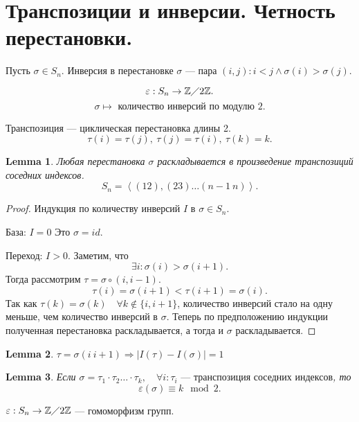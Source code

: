 \documentclass[11pt]{book}
\newcommand{\Z}{\mathbb{Z}}
\theoremstyle{definition}
\theoremstyle{plain}
\theoremstyle{plain}
\newtheorem{lm}{Lemma}
\theoremstyle{definition}
\theoremstyle{remark}
\begin{document}
\section{Транспозиции и инверсии. Четность перестановки.}
\begin{defn}[Инверсия]
    Пусть $\sigma \in  S_n  $.
    {\sf Инверсия} в перестановке $\sigma $ --- пара $(i, j): i < j \wedge \sigma  (i) > \sigma (j)$.
\end{defn}
\begin{defn}
    \[
	\varepsilon : S_n \to \Z \diagup 2\Z
    .\]
    \[
	\sigma  \mapsto \mbox{ количество инверсий по модулю 2}
    .\]
\end{defn}
\begin{defn}
    {\sf Транспозиция} --- циклическая перестановка длины 2.
    \[
	\tau(i)= \tau(j), ~\tau(j) = \tau(i), ~ \tau(k)=k
    .\]
\end{defn}
\begin{lm}
    Любая перестановка $\sigma $ раскладывается в произведение транспозиций соседних индексов.
    \[
	S_n = \left \langle (12), (23) \ldots (n-1~n) \right \rangle
    .\]
\end{lm}
\begin{proof}
    Индукция по количеству инверсий $I$ в $\sigma \in  S_n$.

    База: $I = 0$ Это $\sigma  = id$.

    Переход: $I>0$. Заметим, что \[
	\exists i: \sigma (i) > \sigma (i+1)
    .\]
    Тогда рассмотрим $\tau = \sigma \circ (i, i-1)$.
    \[
	\tau(i) = \sigma (i+1) < \tau(i+1) = \sigma  (i)
    .\]
    Так как $\tau(k) = \sigma (k) \quad \forall k \notin \{i, i+1\}$, количество инверсий стало на одну меньше, чем количество инверсий в $\sigma $.
    Теперь по предположению индукции полученная перестановка раскладывается, а тогда и $\sigma $ раскладывается.
\end{proof}
\begin{lm}
    $\tau = \sigma (i ~ i+1) \Rightarrow |I(\tau) - I(\sigma )| =1$
\end{lm}
\begin{lm}
    Если $\sigma  = \tau_1\cdot \tau_2 \ldots\cdot \tau_k, \quad \forall i: \tau_i \mbox{ --- транспозиция соседних индексов}$, то \[
	\varepsilon (\sigma ) \equiv k \mod 2
    .\]
\end{lm}
\begin{thm}
    $\varepsilon  :S_n \to \Z \diagup  2\Z$ --- гомоморфизм групп.
\end{thm}
\end{document}
